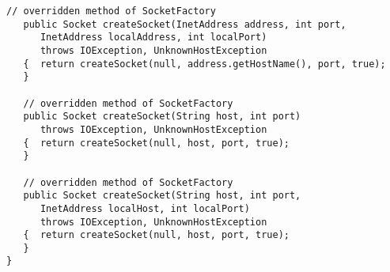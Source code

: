 \begin{lstlisting}[caption=SSL tunneling]
   // overridden method of SocketFactory
   public Socket createSocket(InetAddress address, int port,
      InetAddress localAddress, int localPort)
      throws IOException, UnknownHostException
   {  return createSocket(null, address.getHostName(), port, true);
   }

   // overridden method of SocketFactory
   public Socket createSocket(String host, int port)
      throws IOException, UnknownHostException
   {  return createSocket(null, host, port, true);
   }

   // overridden method of SocketFactory
   public Socket createSocket(String host, int port,
      InetAddress localHost, int localPort)
      throws IOException, UnknownHostException
   {  return createSocket(null, host, port, true);
   }
}
\end{lstlisting}

